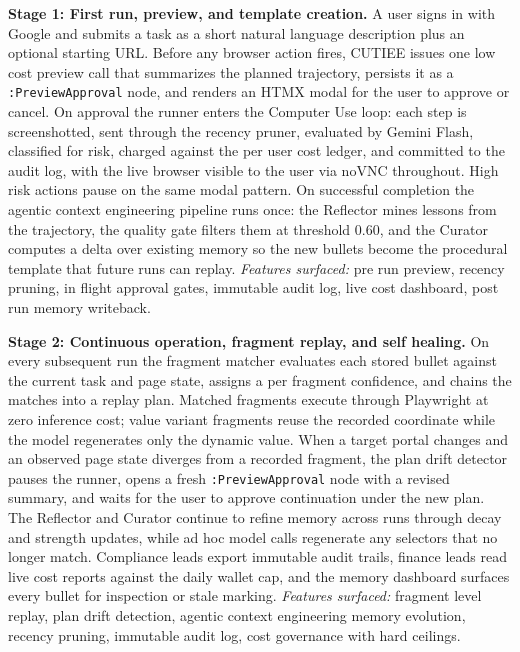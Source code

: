 \documentclass{article}
\theoremstyle{plain}
\theoremstyle{definition}
\theoremstyle{remark}
\begin{document}
\textbf{Stage 1: First run, preview, and template creation.} A user signs in with Google and submits a task as a short natural language description plus an optional starting URL. Before any browser action fires, CUTIEE issues one low cost preview call that summarizes the planned trajectory, persists it as a \texttt{:PreviewApproval} node, and renders an HTMX modal for the user to approve or cancel. On approval the runner enters the Computer Use loop: each step is screenshotted, sent through the recency pruner, evaluated by Gemini Flash, classified for risk, charged against the per user cost ledger, and committed to the audit log, with the live browser visible to the user via noVNC throughout. High risk actions pause on the same modal pattern. On successful completion the agentic context engineering pipeline runs once: the Reflector mines lessons from the trajectory, the quality gate filters them at threshold 0.60, and the Curator computes a delta over existing memory so the new bullets become the procedural template that future runs can replay. \emph{Features surfaced:} pre run preview, recency pruning, in flight approval gates, immutable audit log, live cost dashboard, post run memory writeback.

\textbf{Stage 2: Continuous operation, fragment replay, and self healing.} On every subsequent run the fragment matcher evaluates each stored bullet against the current task and page state, assigns a per fragment confidence, and chains the matches into a replay plan. Matched fragments execute through Playwright at zero inference cost; value variant fragments reuse the recorded coordinate while the model regenerates only the dynamic value. When a target portal changes and an observed page state diverges from a recorded fragment, the plan drift detector pauses the runner, opens a fresh \texttt{:PreviewApproval} node with a revised summary, and waits for the user to approve continuation under the new plan. The Reflector and Curator continue to refine memory across runs through decay and strength updates, while ad hoc model calls regenerate any selectors that no longer match. Compliance leads export immutable audit trails, finance leads read live cost reports against the daily wallet cap, and the memory dashboard surfaces every bullet for inspection or stale marking. \emph{Features surfaced:} fragment level replay, plan drift detection, agentic context engineering memory evolution, recency pruning, immutable audit log, cost governance with hard ceilings.

\small
\end{document}

